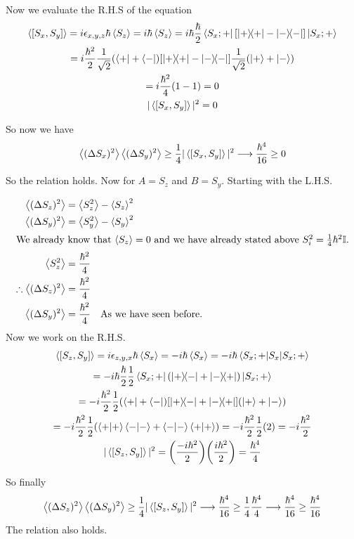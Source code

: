 Now we evaluate the R.H.S of the equation
\begin{gather*}
    \ev{\comm{S_x}{S_y}} = i\epsilon_{x,y,z} \hbar \ev{S_z} = i\hbar \ev{S_z} = i \hbar \frac{\hbar}{2} \bra{S_x;+}\qty[\op{+}{+} - \ketbra{-}]\ket{S_x;+ }\\
    =i\frac{\hbar^2}{2}  \frac{1}{\sqrt{2}} \qty(\bra + + \bra -) \qty[\op{+}{+} - \ketbra{-}]\frac{1}{\sqrt{2}} \qty(\ket + + \ket -)\\
    = i\frac{\hbar^2}{4} (1 - 1) = 0 \\
    |\ev{\comm{S_x}{S_y}}|^2 = 0
\end{gather*}

So now we have 
\[
 \ev{(\Delta S_x)^2}\ev{(\Delta S_y)^2} \ge \frac{1}{4} |\ev{\comm{S_x}{S_y}}|^2 \longrightarrow \frac{\hbar^4}{16} \ge 0
\]

So the relation holds. Now for $A = S_z$ and $B = S_y$. Starting with the L.H.S.

\begin{align*}
    \ev{(\Delta S_z)^2} &= \ev{S_z^2} - \ev{S_z}^2\\
    \ev{(\Delta S_y)^2} &= \ev{S_y^2} - \ev{S_y}^2\\
    \intertext{We already know that $\ev{S_z} = 0$ and we have already stated above $S_i^2 = \frac14 \hbar^2\mathbb{I}$.}
    \ev{S_z^2} &= \frac{\hbar^2}{4} \\
    \therefore \ev{(\Delta S_z)^2} &= \frac{\hbar^2}{4}\\
    \ev{(\Delta S_y)^2} &= \frac{\hbar^2}{4} \qq{As we have seen before.}\\
\end{align*}
Now we work on the R.H.S. 
\begin{gather*}
    \ev{\comm{S_z}{S_y}} = i\epsilon_{z,y,x} \hbar \ev{S_x} = -i\hbar \ev{S_x}= -i \hbar \ev{S_x}{S_x;+}\\
    = -i\hbar\frac{\hbar}{2}\frac12 \bra{S_x;+}\qty(\op{+}{-} + \op{-}{+})\ket{S_x;+ }\\
    = -i\frac{\hbar^2}{2} \frac12  \qty(\bra + + \bra -) \qty[\op{+}{-} + \ketbra{-}{+}] \qty(\ket + + \ket -)\\
    = -i\frac{\hbar^2}{2} \frac12 (\braket{+} \braket{-} + \braket{-} \braket{+}) = -i \frac{\hbar^2}{2} \frac12 (2) = -i\frac{\hbar^2}{2}\\
    |\ev{\comm{S_z}{S_y}}|^2 = \qty(\frac{-i\hbar^2}{2})\qty(\frac{i\hbar^2}{2}) = \frac{\hbar^4}{4}
\end{gather*}


So finally
 \[
 \ev{(\Delta S_z)^2}\ev{(\Delta S_y)^2} \ge \frac{1}{4} |\ev{\comm{S_z}{S_y}}|^2 \longrightarrow \frac{\hbar^4}{16} \ge \frac14 \frac{\hbar^4}{4} \longrightarrow \frac{\hbar^4}{16} \ge \frac{\hbar^4}{16}
 \]
 The relation also holds.